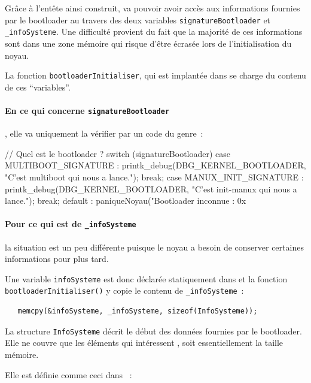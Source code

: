    Grâce à l'entête ainsi construit, \manux va pouvoir avoir accès aux
informations fournies par le bootloader au travers des deux variables
\lstinline!signatureBootloader! et \lstinline!_infoSysteme!. Une
difficulté provient du fait que la majorité de ces informations sont
dans une zone mémoire qui risque d'être écrasée lors de
l'initialisation du noyau. 

   La fonction \lstinline!bootloaderInitialiser!, qui est implantée dans
 se charge du  contenu de ces
``variables''.

   \paragraph{En ce qui concerne \lstinline!signatureBootloader!}, elle va
uniquement la vérifier par un code du genre~:

\begin{listing}
   // Quel est le bootloader ?
   switch (signatureBootloader) {
      case MULTIBOOT_SIGNATURE :
         printk_debug(DBG_KERNEL_BOOTLOADER, "C'est multiboot qui nous a lance.\n");
      break;
      case MANUX_INIT_SIGNATURE :
         printk_debug(DBG_KERNEL_BOOTLOADER, "C'est init-manux qui nous a lance.\n");
      break;
      default :
         paniqueNoyau("Bootloader inconnue : 0x%
   }  
\end{listing}

\paragraph{Pour ce qui est de \lstinline!_infoSysteme!} la situation
est un peu différente puisque le noyau a besoin de conserver certaines
informations pour plus tard.

   Une variable \lstinline!infoSysteme! est donc déclarée statiquement
dans  et la fonction
\lstinline!bootloaderInitialiser()! y copie le contenu de
\lstinline!_infoSysteme!~:

\begin{lstlisting}
   memcpy(&infoSysteme, _infoSysteme, sizeof(InfoSysteme));
\end{lstlisting}

   La structure \lstinline!InfoSysteme! décrit le début des données
fournies par le bootloader. Elle ne couvre que les éléments qui
intéressent \manux, soit essentiellement la taille mémoire.

   Elle est définie comme ceci dans
   ~:

